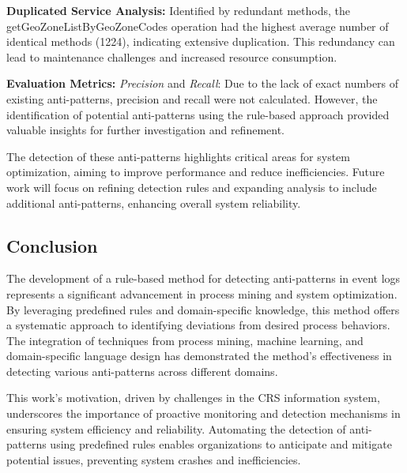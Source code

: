 \documentclass[12pt, times]{article}
\begin{document}
	\hspace*{5mm} \textbf{Duplicated Service Analysis:} Identified by redundant methods, the getGeoZoneListByGeoZoneCodes operation had the highest average number of identical methods (1224), indicating extensive duplication. This redundancy can lead to maintenance challenges and increased resource consumption.
	
	\hspace*{5mm} \textbf{Evaluation Metrics:} \textit{Precision} and \textit{Recall}: Due to the lack of exact numbers of existing anti-patterns, precision and recall were not calculated. However, the identification of potential anti-patterns using the rule-based approach provided valuable insights for further investigation and refinement.
	
	\hspace*{5mm} The detection of these anti-patterns highlights critical areas for system optimization, aiming to improve performance and reduce inefficiencies. Future work will focus on refining detection rules and expanding analysis to include additional anti-patterns, enhancing overall system reliability.
	
	\subsection*{Conclusion}
	
	\hspace*{5mm} The development of a rule-based method for detecting anti-patterns in event logs represents a significant advancement in process mining and system optimization. By leveraging predefined rules and domain-specific knowledge, this method offers a systematic approach to identifying deviations from desired process behaviors. The integration of techniques from process mining, machine learning, and domain-specific language design has demonstrated the method's effectiveness in detecting various anti-patterns across different domains.
	
	\hspace*{5mm} This work's motivation, driven by challenges in the CRS information system, underscores the importance of proactive monitoring and detection mechanisms in ensuring system efficiency and reliability. Automating the detection of anti-patterns using predefined rules enables organizations to anticipate and mitigate potential issues, preventing system crashes and inefficiencies.
	
\end{document}

